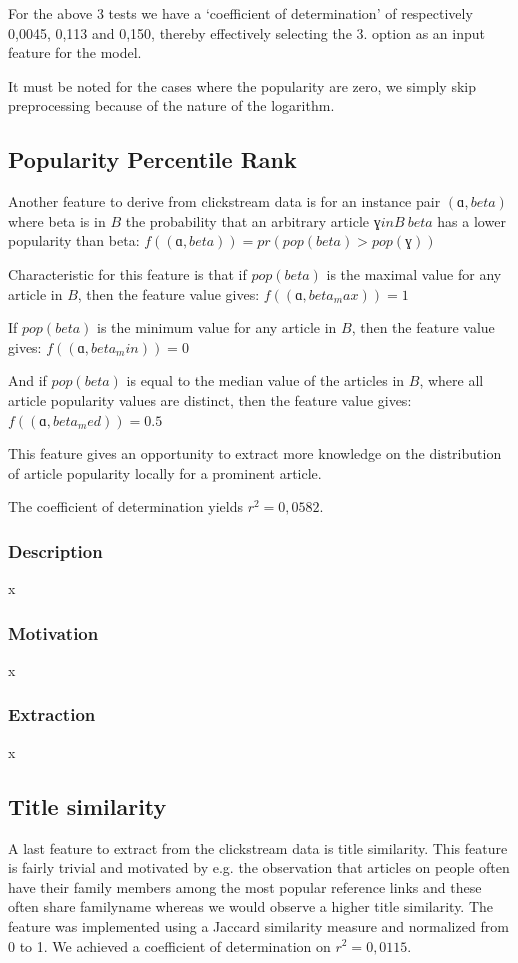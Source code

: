 For the above 3 tests we have a `coefficient of determination' of respectively 0,0045, 0,113 and 0,150, thereby effectively selecting the 3. option as an input feature for the model.

It must be noted for the cases where the popularity are zero, we simply skip preprocessing because of the nature of the logarithm.





\subsection{Popularity Percentile Rank}


Another feature to derive from clickstream data is for an instance pair $( ɑ , beta)$ where beta is in $B$ the probability that an arbitrary article $ɣ in B \ { beta }$ has a lower popularity than beta:
$f( ( ɑ , beta) ) = pr( pop(beta) > pop(ɣ) )$

Characteristic for this feature is that if $pop(beta)$ is the maximal value for any article in $B$, then the feature value gives:
$f( ( ɑ , beta_max) ) = 1$

If $pop(beta)$ is the minimum value for any article in $B$, then the feature value gives:
$f( ( ɑ , beta_min) ) = 0$

And if $pop(beta)$ is equal to the median value of the articles in $B$, where all article popularity values are distinct, then the feature value gives:
$f( ( ɑ , beta_med) ) = 0.5$

This feature gives an opportunity to extract more knowledge on the distribution of article popularity locally for a prominent article.

The coefficient of determination yields $r^2 = 0,0582$.

\subsubsection{Description}
x
\subsubsection{Motivation}
x
\subsubsection{Extraction}
x




\subsection{Title similarity}
A last feature to extract from the clickstream data is title similarity. This feature is fairly trivial and motivated by e.g. the observation that articles on people often have their family members among the most popular reference links and these often share familyname whereas we would observe a higher title similarity. The feature was implemented using a Jaccard similarity measure and normalized from 0 to 1. We achieved a coefficient of determination on $r^2 = 0,0115$.


 \\